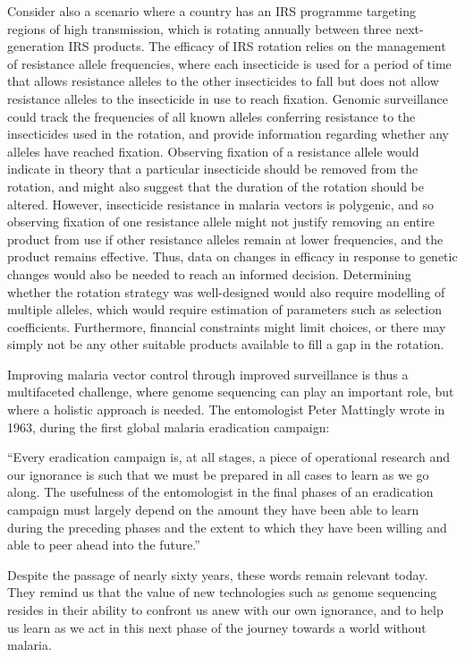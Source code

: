 \begin{refsection}
Consider also a scenario where a country has an IRS programme targeting regions of high transmission, which is rotating annually between three next-generation IRS products.
%
The efficacy of IRS rotation relies on the management of resistance allele frequencies, where each insecticide is used for a period of time that allows resistance alleles to the other insecticides to fall but does not allow resistance alleles to the insecticide in use to reach fixation.
%
Genomic surveillance could track the frequencies of all known alleles conferring resistance to the insecticides used in the rotation, and provide information regarding whether any alleles have reached fixation.
%
Observing fixation of a resistance allele would indicate in theory that a particular insecticide should be removed from the rotation, and might also suggest that the duration of the rotation should be altered.
%
However, insecticide resistance in malaria vectors is polygenic, and so observing fixation of one resistance allele might not justify removing an entire product from use if other resistance alleles remain at lower frequencies, and the product remains effective.
%
Thus, data on changes in efficacy in response to genetic changes would also be needed to reach an informed decision.
%
Determining whether the rotation strategy was well-designed would also require modelling of multiple alleles, which would require estimation of parameters such as selection coefficients.
%
Furthermore, financial constraints might limit choices, or there may simply not be any other suitable products available to fill a gap in the rotation.


Improving malaria vector control through improved surveillance is thus a multifaceted challenge, where genome sequencing can play an important role, but where a holistic approach is needed.
%
The entomologist Peter Mattingly wrote in 1963, during the first global malaria eradication campaign:


\begin{displayquote}
``Every eradication campaign is, at all stages, a piece of operational research and our ignorance is such that we must be prepared in all cases to learn as we go along. The usefulness of the entomologist in the final phases of an eradication campaign must largely depend on the amount they have been able to learn during the preceding phases and the extent to which they have been willing and able to peer ahead into the future.''
\end{displayquote}


Despite the passage of nearly sixty years, these words remain relevant today.
%
They remind us that the value of new technologies such as genome sequencing resides in their ability to confront us anew with our own ignorance, and to help us learn as we act in this next phase of the journey towards a world without malaria.


\printbibliography[
heading=subbibintoc,
title={References}
]


\end{refsection}
